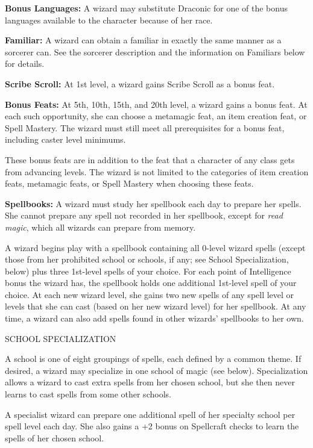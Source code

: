 \documentclass{article}
\begin{document}
\textbf{Bonus Languages:} A wizard may substitute Draconic for one of the bonus 
languages available to the character because of her race.

\textbf{Familiar:} A wizard can obtain a familiar in exactly the same manner as 
a sorcerer can. See the sorcerer description and the information on Familiars below 
for details.

\textbf{Scribe Scroll:} At 1st level, a wizard gains Scribe Scroll as a bonus feat. 

\textbf{Bonus Feats:} At 5th, 10th, 15th, and 20th level, a wizard gains a bonus 
feat. At each such opportunity, she can choose a metamagic feat, an item creation 
feat, or Spell Mastery. The wizard must still meet all prerequisites for a bonus 
feat, including caster level minimums.

These bonus feats are in addition to the feat that a character of any class gets 
from advancing levels. The wizard is not limited to the categories of item creation 
feats, metamagic feats, or Spell Mastery when choosing these feats.

\textbf{Spellbooks:} A wizard must study her spellbook each day to prepare her 
spells. She cannot prepare any spell not recorded in her spellbook, except for 
\textit{read magic}, which all wizards can prepare from memory.

A wizard begins play with a spellbook containing all 0-level wizard spells (except 
those from her prohibited school or schools, if any; see School Specialization, 
below) plus three 1st-level spells of your choice. For each point of Intelligence 
bonus the wizard has, the spellbook holds one additional 1st-level spell of your 
choice. At each new wizard level, she gains two new spells of any spell level or 
levels that she can cast (based on her new wizard level) for her spellbook. At 
any time, a wizard can also add spells found in other wizards' spellbooks to her 
own.

\vspace{12pt}
SCHOOL SPECIALIZATION

A school is one of eight groupings of spells, each defined by a common theme. If 
desired, a wizard may specialize in one school of magic (see below). Specialization 
allows a wizard to cast extra spells from her chosen school, but she then never 
learns to cast spells from some other schools.

A specialist wizard can prepare one additional spell of her specialty school per 
spell level each day. She also gains a +2 bonus on Spellcraft checks to learn the 
spells of her chosen school.
\end{document}
